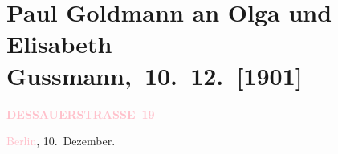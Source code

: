 

\renewcommand{\erwaehntePersonen}{Personen: Alfred Gold, Paul Goldmann, Gerhart Hauptmann,  Kohrl, Johanna Mamroth, Fedor Mamroth, Paul Marx, Olga Schnitzler, Elisabeth Steinrück}
\renewcommand{\erwaehnteInstitutionen}{Institutionen: Frankfurter Zeitung}
\renewcommand{\erwaehnteOrte}{Orte: ?? [Wohnung von Olga und Elisabeth Gussmann, 1901/1902], Berlin, Dessauer Straße, Grünentorgasse, Hauptstraße 56, Südtirol, Tirol, Wien}
\renewcommand{\erwaehnteWerke}{Werke: Barcarole, Der rothe Hahn. Tragikomödie in vier Akten, Hoffmanns Erzählungen}
\section[ Paul Goldmann an Olga und Elisabeth Gussmann, 10. 12. {[}1901{]}]{Paul Goldmann an Olga und Elisabeth Gussmann, 10. 12. {[}1901{]}}
\nopagebreak{}
\rehead{ }\normalsize\beginnumbering{}
\toendnotes[C]{\smallbreak\pagebreak[2]}
\toendnotes[C]{\smallbreak}
\pstart
           \noindent{}\raggedleft{}{\pb}\textcolor{gray}{\textbf{\textcolor{pink}{DESSAUERSTRASSE 19}{}\ledrightnote{\textcolor{pink}{Dessauer Straße}}}}\pend
           
\pstart
           \textcolor{pink}{Berlin}{}\ledrightnote{\textcolor{pink}{Berlin}}, 10. Dezember.\pend
           
